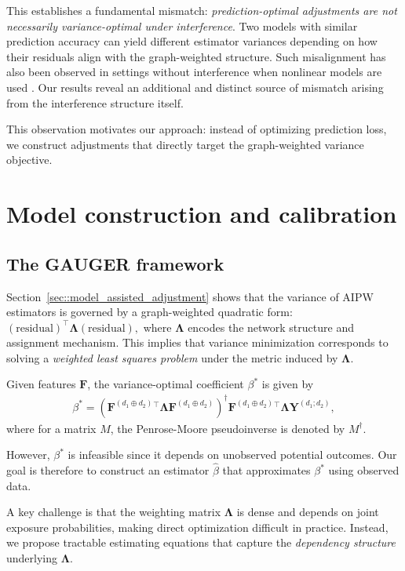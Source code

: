 \documentclass[twoside,letterpaper]{article}
\theoremstyle{plain}
\theoremstyle{definition}
\theoremstyle{remark}
\newcommand{\bY}{\boldsymbol{Y}}
\newcommand{\bF}{\boldsymbol{F}}
\newcommand{\bLambda}{\boldsymbol{\Lambda}}
\newcommand{\bFaug}{\bF^{(d_1\oplus d_2)}}
\begin{document}
This establishes a fundamental mismatch: \emph{prediction-optimal adjustments are not necessarily variance-optimal under interference}. Two models with similar prediction accuracy can yield  different estimator variances depending on how their residuals align with the graph-weighted structure. Such misalignment has also been observed in settings without interference when nonlinear models are used \citep{fogarty2018regression, guo2023generalized}. Our results reveal an additional and distinct source of mismatch arising from the interference structure itself.

This observation motivates our approach: instead of optimizing prediction loss, we construct adjustments that directly target the graph-weighted variance objective.

\section{Model construction and calibration}
\label{sec::calibration}

\subsection{The GAUGER framework}
\label{sec::gauger}
Section~\ref{sec::model_assisted_adjustment} shows that the variance of AIPW estimators is governed by a graph-weighted quadratic form:
$(\text{residual})^\top \bLambda (\text{residual}),$
where $\bLambda$ encodes the network structure and assignment mechanism. This implies that variance minimization corresponds to solving a \emph{weighted least squares problem} under the metric induced by $\bLambda$.

Given features $\bF$, the variance-optimal coefficient $\beta^*$ is given by
\begin{align}\label{eq::beta-star}
    \beta^{*}  
    = (\bFaug{}^{\top}\bLambda\bFaug)^{\dagger}\bFaug{}^{\top}\bLambda\bY^{(d_1;d_2)},
\end{align}
where for a matrix $M$, the Penrose-Moore pseudoinverse is denoted  by $M^\dagger$.


However, $\beta^*$ is infeasible since it depends on unobserved potential outcomes. Our goal is therefore to construct an estimator $\hat{\beta}$ that approximates $\beta^*$ using observed data.

A key challenge is that the weighting matrix $\bLambda$ is dense and depends on joint exposure probabilities, making direct optimization difficult in practice. Instead, we propose tractable estimating equations that capture the \emph{dependency structure} underlying $\bLambda$.
\end{document}
